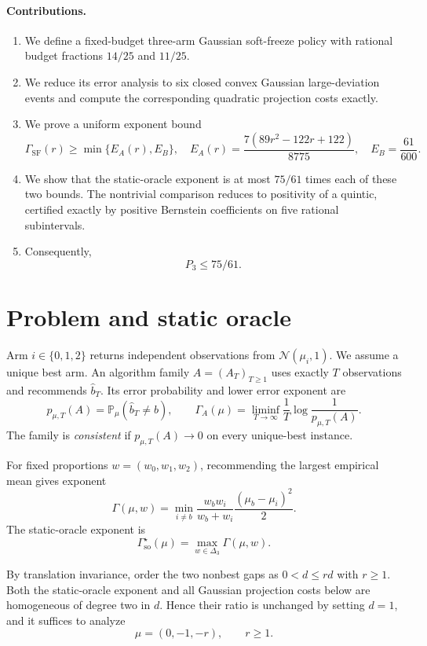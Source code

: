 \documentclass[11pt]{article}
\theoremstyle{definition}
\theoremstyle{remark}
\newcommand{\Pp}{\mathbb{P}}
\newcommand{\SF}{\mathrm{SF}}
\newcommand{\so}{\mathrm{so}}
\begin{document}
\paragraph{Contributions.}
\begin{enumerate}[leftmargin=*,itemsep=2pt]
    \item We define a fixed-budget three-arm Gaussian soft-freeze policy with rational budget fractions $14/25$ and $11/25$.
    \item We reduce its error analysis to six closed convex Gaussian large-deviation events and compute the corresponding quadratic projection costs exactly.
    \item We prove a uniform exponent bound
    \[
    \Gamma_{\SF}(r)\ge \min\{E_A(r),E_B\},
    \quad
    E_A(r)=\frac{7(89r^2-122r+122)}{8775},
    \quad
    E_B=\frac{61}{600}.
    \]
    \item We show that the static-oracle exponent is at most $75/61$ times each of these two bounds. The nontrivial comparison reduces to positivity of a quintic, certified exactly by positive Bernstein coefficients on five rational subintervals.
    \item Consequently,
    \[
    \boxed{P_3\le 75/61}.
    \]
\end{enumerate}

\section{Problem and static oracle}

Arm $i\in\{0,1,2\}$ returns independent observations from $\mathcal N(\mu_i,1)$. We assume a unique best arm. An algorithm family $A=(A_T)_{T\ge1}$ uses exactly $T$ observations and recommends $\widehat b_T$. Its error probability and lower error exponent are
\[
p_{\mu,T}(A)=\Pp_\mu(\widehat b_T\ne b),
\qquad
\Gamma_A(\mu)=\liminf_{T\to\infty}\frac1T\log\frac1{p_{\mu,T}(A)}.
\]
The family is \emph{consistent} if $p_{\mu,T}(A)\to0$ on every unique-best instance.

For fixed proportions $w=(w_0,w_1,w_2)$, recommending the largest empirical mean gives exponent
\begin{equation}
\Gamma(\mu,w)
=
\min_{i\ne b}
\frac{w_bw_i}{w_b+w_i}\frac{(\mu_b-\mu_i)^2}{2}.
\label{eq:static-fixed}
\end{equation}
The static-oracle exponent is
\[
\Gamma_{\so}^\star(\mu)=\max_{w\in\Delta_3}\Gamma(\mu,w).
\]

By translation invariance, order the two nonbest gaps as $0<d\le rd$ with $r\ge1$. Both the static-oracle exponent and all Gaussian projection costs below are homogeneous of degree two in $d$. Hence their ratio is unchanged by setting $d=1$, and it suffices to analyze
\begin{equation}
\mu=(0,-1,-r),\qquad r\ge1.
\label{eq:normalized-means}
\end{equation}
\end{document}
